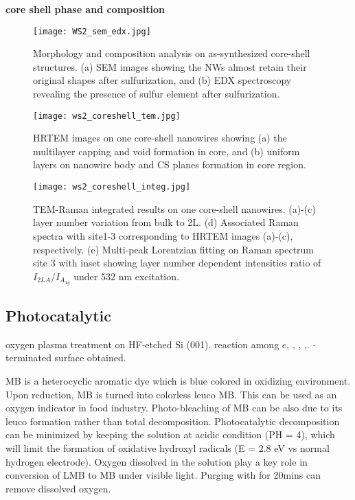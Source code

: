 \documentclass[11pt]{article} %
\begin{document}
\textbf{core shell phase and composition}

\begin{figure}[htb]
\centering
\texttt{[image: WS2\_sem\_edx.jpg]}
\caption{ Morphology and composition analysis on as-synthesized core-shell structures. (a) SEM images showing the NWs almost retain their original shapes after sulfurization, and (b) EDX spectroscopy revealing the presence of sulfur element after sulfurization.}
\label{fig:ws2sem}
\end{figure}

\begin{figure}[htb]
\centering
\texttt{[image: ws2\_coreshell\_tem.jpg]}
\caption{HRTEM images on one core-shell nanowires showing (a) the multilayer capping and void formation in  core, and (b) uniform  layers on nanowire body and CS planes formation in core region.}
\label{fig:ws2tem}
\end{figure}
\begin{figure}[htb]
\centering
\texttt{[image: ws2\_coreshell\_integ.jpg]}
\caption{TEM-Raman integrated results on one core-shell nanowires. (a)-(c)  layer number variation from bulk to 2L. (d) Associated Raman spectra with site1-3 corresponding to HRTEM images (a)-(c), respectively. (e) Multi-peak Lorentzian fitting on Raman spectrum site 3 with inset showing layer number dependent intensities ratio of $I_{2LA}/I_{A_{1g}}$ under 532 nm excitation.}
\label{fig:ws2ram}
\end{figure}


\subsection{Photocatalytic}

 oxygen plasma treatment on HF-etched Si (001). reaction among $e$, , , ,. -terminated surface obtained.\cite{Habib2010}


MB is a heterocyclic aromatic dye which is blue colored in oxidizing environment. Upon reduction, MB is turned into colorless leuco MB. This can be used as an oxygen indicator in food industry. Photo-bleaching of MB can be also due to its leuco formation rather than total decomposition. Photocatalytic decomposition can be minimized by keeping the solution at acidic condition (PH = 4), which will limit the formation of oxidative hydroxyl radicals (E = 2.8 eV vs normal hydrogen electrode). Oxygen dissolved in the solution play a key role in conversion of LMB to MB under visible light. Purging with  for 20mins can remove dissolved oxygen.\cite{Wang2014a}
\end{document}
